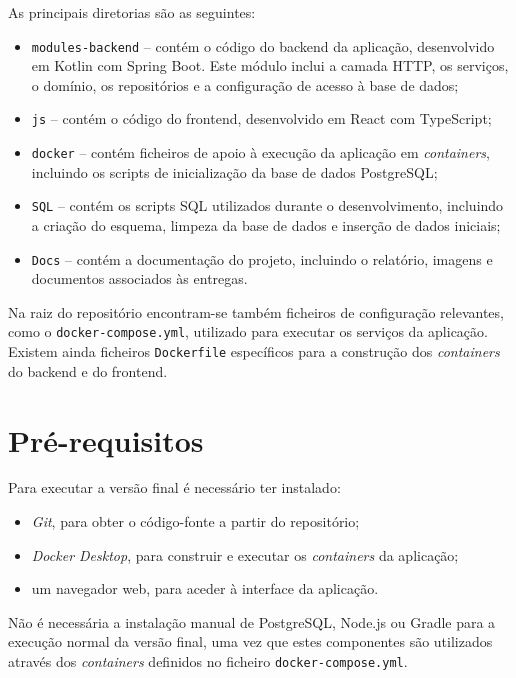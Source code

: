 \documentclass[11pt,a4paper]{article}
\begin{document}
As principais diretorias são as seguintes:

\begin{itemize}
  \item \texttt{modules-backend} -- contém o código do backend da aplicação, desenvolvido em Kotlin com Spring Boot. Este módulo inclui a camada HTTP, os serviços, o domínio, os repositórios e a configuração de acesso à base de dados;
  \item \texttt{js} -- contém o código do frontend, desenvolvido em React com TypeScript;
  \item \texttt{docker} -- contém ficheiros de apoio à execução da aplicação em \textit{containers}, incluindo os scripts de inicialização da base de dados PostgreSQL;
  \item \texttt{SQL} -- contém os scripts SQL utilizados durante o desenvolvimento, incluindo a criação do esquema, limpeza da base de dados e inserção de dados iniciais;
  \item \texttt{Docs} -- contém a documentação do projeto, incluindo o relatório, imagens e documentos associados às entregas.
\end{itemize}

Na raiz do repositório encontram-se também ficheiros de configuração relevantes, como o \texttt{docker-compose.yml}, utilizado para executar os serviços da aplicação. Existem ainda ficheiros \texttt{Dockerfile} específicos para a construção dos \textit{containers} do backend e do frontend.

\section{Pré-requisitos}

Para executar a versão final é necessário ter instalado:

\begin{itemize}
  \item \textit{Git}, para obter o código-fonte a partir do repositório;
  \item \textit{Docker Desktop}, para construir e executar os \textit{containers} da aplicação;
  \item um navegador web, para aceder à interface da aplicação.
\end{itemize}

Não é necessária a instalação manual de PostgreSQL, Node.js ou Gradle para a execução normal da versão final, uma vez que estes componentes são utilizados através dos \textit{containers} definidos no ficheiro \texttt{docker-compose.yml}.
\end{document}

